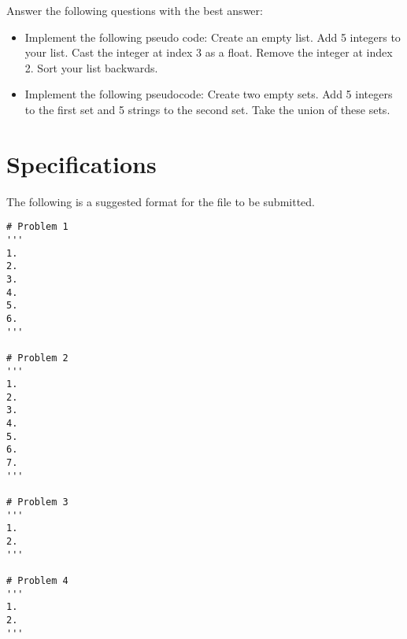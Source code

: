 \begin{problem}
Answer the following questions with the best answer:

\begin{itemize}
\item Implement the following pseudo code: Create an empty list. 
Add 5 integers to your list. 
Cast the integer at index 3 as a float.
Remove the integer at index 2. 
Sort your list backwards. 
\item Implement the following pseudocode: Create two empty sets.
Add 5 integers to the first set and 5 strings to the second set.
Take the union of these sets.

\end{itemize}
\end{problem}

\section*{Specifications}
The following is a suggested format for the  file to be submitted.
\begin{lstlisting}
# Problem 1
'''
1. 
2. 
3. 
4. 
5. 
6. 
'''

# Problem 2	
'''
1. 
2.
3. 
4. 
5. 
6. 
7. 
'''

# Problem 3
'''	
1.
2.
'''

# Problem 4
'''
1. 
2. 
'''
\end{lstlisting}	
